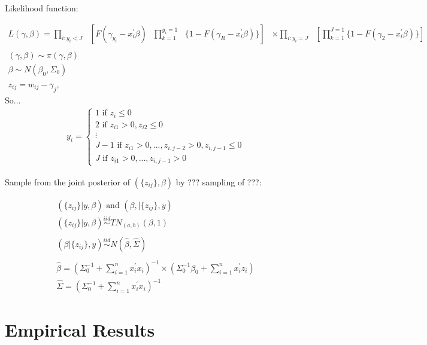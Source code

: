 Likelihood function: 

\begin{eqnarray}
	L(\gamma,\beta) = \prod_{i\colon y_{i}<J}\text{ }[ F(\gamma_{y_{i}} - x_{i}^{'}\beta)\text{ }\prod_{k=1}^{y_{i}=1}\text{ }\{1-F(\gamma_{R}-x_{i}^{'}\beta)\}] &\times \displaystyle \prod_{i\colon y_{i}=J}\text{ }[\prod_{k=1}^{J=1} \{1-F(\gamma_{2} - x_{i}^{'}\beta)\}] \nonumber \\
	\nonumber \\
	(\gamma,\beta) \sim \pi (\gamma,\beta) & \nonumber \\
	\beta \sim N(\beta_{0},\Sigma_{0}) & \nonumber \\
	\nonumber \\
	z_{ij} = w_{ij} - \gamma_{j}, & \nonumber
	\end{eqnarray}
	So...
	\begin{eqnarray}
	y_{i} = 
	\begin{cases}
	1\text{ if }z_{i} \leq 0 \nonumber \\
	2\text{ if }z_{i1} > 0, z_{i2} \leq 0 \nonumber \\
	\vdots \nonumber \\
	J-1\text{ if }z_{i1} > 0,...,z_{i,j-2}>0,z_{i,j-1}\leq0 \nonumber \\
	J\text{ if }z_{i1}>0,...,z_{i,j-1}>0
\end{cases}
\end{eqnarray}

Sample from the joint posterior of $(\{z_{ij}\},\beta)$ by ??? sampling of ???: 

\begin{eqnarray}
	(\{z_{ij}\} | y,\beta)\text{ and }(\beta,|\{z_{ij}\},y) \nonumber \\
	(\{z_{ij}\} | y,\beta)\stackrel{iid}{\sim}TN_{(a,b)}(\beta,1) \nonumber \\
	\nonumber \\
	(\beta | \{z_{ij}\},y)\stackrel{iid}{\sim}N(\hat{\beta},\hat{\Sigma}) \nonumber \\
	\nonumber \\
	\hat{\beta} = (\Sigma_{0}^{-1}+\sum_{i=1}^{n} x_{i}^{'}x_{i})^{-1} \times (\Sigma_{0}^{-1}\beta_{0}+\sum_{i=1}^{n} x_{i}^{'}z_{i}) \nonumber \\
	\hat{\Sigma} = (\Sigma_{0}^{-1} + \sum_{i=1}^{n} x_{i}^{'}x_{i})^{-1} \nonumber
\end{eqnarray}

\section*{Empirical Results}

